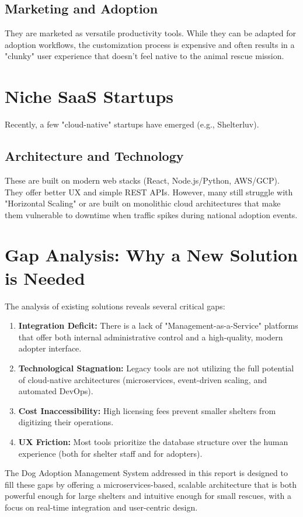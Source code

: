 \subsection{Marketing and Adoption}
They are marketed as versatile productivity tools. While they can be adapted for adoption workflows, the customization process is expensive and often results in a "clunky" user experience that doesn't feel native to the animal rescue mission.

\section{Niche SaaS Startups}

Recently, a few "cloud-native" startups have emerged (e.g., Shelterluv).

\subsection{Architecture and Technology}
These are built on modern web stacks (React, Node.js/Python, AWS/GCP). They offer better UX and simple REST APIs. However, many still struggle with "Horizontal Scaling" or are built on monolithic cloud architectures that make them vulnerable to downtime when traffic spikes during national adoption events.

\section{Gap Analysis: Why a New Solution is Needed}

The analysis of existing solutions reveals several critical gaps:
\begin{enumerate}
    \item \textbf{Integration Deficit:} There is a lack of "Management-as-a-Service" platforms that offer both internal administrative control and a high-quality, modern adopter interface.
    \item \textbf{Technological Stagnation:} Legacy tools are not utilizing the full potential of cloud-native architectures (microservices, event-driven scaling, and automated DevOps).
    \item \textbf{Cost Inaccessibility:} High licensing fees prevent smaller shelters from digitizing their operations.
    \item \textbf{UX Friction:} Most tools prioritize the database structure over the human experience (both for shelter staff and for adopters).
\end{enumerate}

The Dog Adoption Management System addressed in this report is designed to fill these gaps by offering a microservices-based, scalable architecture that is both powerful enough for large shelters and intuitive enough for small rescues, with a focus on real-time integration and user-centric design.

